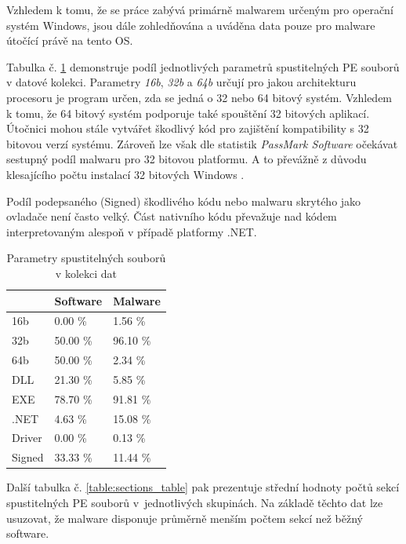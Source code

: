 Vzhledem k tomu, že se práce zabývá primárně malwarem určeným pro operační systém Windows, jsou dále zohledňována a uváděna data pouze pro malware útočící právě na tento OS.

Tabulka č. \ref{table:pefile_table} demonstruje podíl jednotlivých parametrů spustitelných PE souborů v datové kolekci. Parametry \emph{16b}, \emph{32b} a \emph{64b} určují pro jakou architekturu procesoru je program určen, zda se jedná o 32 nebo 64 bitový systém. Vzhledem k tomu, že 64 bitový systém podporuje také spouštění 32 bitových aplikací. Útočnici mohou stále vytvářet škodlivý kód pro zajištění kompatibility s 32 bitovou verzí systému. Zároveň lze však dle statistik \emph{PassMark Software} očekávat sestupný podíl malwaru pro 32 bitovou platformu. A to převážně z důvodu klesajícího počtu instalací 32 bitových Windows \cite{passmark_32_stats}. 

Podíl podepsaného (Signed) škodlivého kódu nebo malwaru skrytého jako ovladače není často velký. Část nativního kódu převažuje nad kódem interpretovaným alespoň v případě platformy .NET.

\begin{table}[H]
    \caption{Parametry spustitelných souborů v kolekci dat}
    \label{table:pefile_table}
    
    \centering
    \begin{tabular}{|l|l|l|}
        \hline
               & Software & Malware \\ 
        \hline
        \hline
        16b    & 0.00 \%   & 1.56 \%  \\ \hline
        32b    & 50.00 \%  & 96.10 \% \\ \hline
        64b    & 50.00 \%  & 2.34 \%  \\ \hline
        DLL    & 21.30 \%  & 5.85 \%  \\ \hline
        EXE    & 78.70 \%  & 91.81 \% \\ \hline
        .NET   & 4.63 \%   & 15.08 \% \\ \hline
        Driver & 0.00 \%   & 0.13 \%  \\ \hline
        Signed & 33.33 \%  & 11.44 \% \\ \hline
    \end{tabular}
\end{table}

Další tabulka č. \ref{table:sections_table} pak prezentuje střední hodnoty počtů sekcí spustitelných PE souborů v~jednotlivých skupinách. Na základě těchto dat lze usuzovat, že malware disponuje průměrně menším počtem sekcí než běžný software. 

